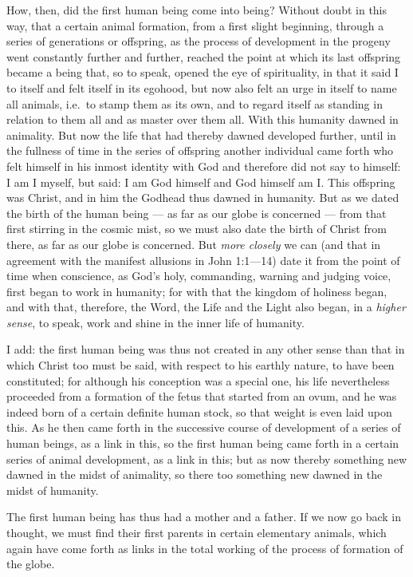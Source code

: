 \documentclass[12pt,a4paper,openany]{book}
\newcommand{\opage}[1]{\marginnote{\footnotesize\textit{[#1]}}}
\begin{document}
How, then, did the first human being come into being? Without doubt in this way,
that a certain animal formation, from a first slight beginning, through a series of
generations or offspring, as the process of development in the progeny went
constantly further and further, reached the point at which its last offspring became
a being that, so to speak, opened the eye of spirituality, in that it said I to
itself and felt itself in its egohood, but now also felt an urge in itself to name
all animals, i.e.\ to stamp them as its own, and to regard itself as standing in
relation to them all and as master over them all. With this humanity dawned in
animality. But now the life that had thereby dawned developed further, until in the
fullness of time in the series of offspring another individual came forth who felt
himself in his
\setcounter{footnote}{0}%
\opage{127}inmost identity with God and therefore did not say to himself: I am I myself, but
said: I am God himself and God himself am I. This offspring was Christ, and in him
the Godhead thus dawned in humanity. But as we dated the birth of the human being
--- as far as our globe is concerned --- from that first stirring in the cosmic mist,
so we must also date the birth of Christ from there, as far as our globe is
concerned. But \emph{more closely} we can (and that in agreement with the manifest
allusions in John 1:1---14) date it from the point of time when conscience, as God's
holy, commanding, warning and judging voice, first began to work in humanity; for
with that the kingdom of holiness began, and with that, therefore, the Word, the
Life and the Light also began, in a \emph{higher sense}, to speak, work and shine in
the inner life of humanity.

I add: the first human being was thus not created in any other sense than that in
which Christ too must be said, with respect to his earthly nature, to have been
constituted; for although his conception was a special one, his life nevertheless
proceeded from a formation of the fetus that started from an ovum, and he was indeed
born of a certain definite human stock, so that weight is even laid upon this. As he
then came forth in the successive course of development of a series of human beings,
as a link in this, so the first human being came forth in a certain series of animal
development, as a link in this; but as now thereby something new dawned in the midst
of animality, so there too something new dawned in the midst of humanity.

The first human being has thus had a mother and a father. If we now go back in
thought, we must find their first parents in certain elementary animals, which again
have come forth as links in the total working of the process of formation of the
globe.
\end{document}
